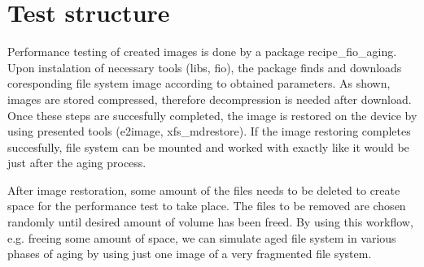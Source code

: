 \documentclass[
  color, %
  table, %
  lof,   %
  lot,   %
]{fithesis3}
\begin{document}






\section{Test structure}
Performance testing of created images is done by a package recipe\_fio\_aging. Upon instalation of necessary tools (libs, fio), the package finds and downloads coresponding file system image according to obtained parameters. As shown, images are stored compressed, therefore decompression is needed after download. Once these steps are succesfully completed, the image is restored on the device by using presented tools (e2image, xfs\_mdrestore). If the image restoring completes succesfully, file system can be mounted and worked with exactly like it would be just after the aging process.

After image restoration, some amount of the files needs to be deleted to create space for the performance test to take place. The files to be removed are chosen randomly until desired amount of volume has been freed. By using this workflow, e.g. freeing some amount of space, we can simulate aged file system in various phases of aging by using just one image of a very fragmented file system.
\end{document}
